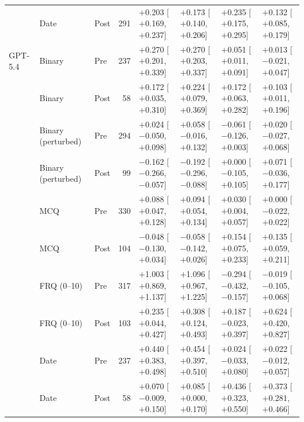 \begin{table}[p]
\begin{tabular}{l l l r l l l l}
 & Date & Post & 291 & $+$0.203 {\scriptsize[$+$0.169, $+$0.237]} & $+$0.173 {\scriptsize[$+$0.140, $+$0.206]} & $+$0.235 {\scriptsize[$+$0.175, $+$0.295]} & $+$0.132 {\scriptsize[$+$0.085, $+$0.179]} \\
\addlinespace
GPT-5.4 & Binary & Pre & 237 & $+$0.270 {\scriptsize[$+$0.201, $+$0.339]} & $+$0.270 {\scriptsize[$+$0.203, $+$0.337]} & $+$0.051 {\scriptsize[$+$0.011, $+$0.091]} & $+$0.013 {\scriptsize[$-$0.021, $+$0.047]} \\
 & Binary & Post & 58 & $+$0.172 {\scriptsize[$+$0.035, $+$0.310]} & $+$0.224 {\scriptsize[$+$0.079, $+$0.369]} & $+$0.172 {\scriptsize[$+$0.063, $+$0.282]} & $+$0.103 {\scriptsize[$+$0.011, $+$0.196]} \\
 & Binary (perturbed) & Pre & 294 & $+$0.024 {\scriptsize[$-$0.050, $+$0.098]} & $+$0.058 {\scriptsize[$-$0.016, $+$0.132]} & $-$0.061 {\scriptsize[$-$0.126, $+$0.003]} & $+$0.020 {\scriptsize[$-$0.027, $+$0.068]} \\
 & Binary (perturbed) & Post & 99 & $-$0.162 {\scriptsize[$-$0.266, $-$0.057]} & $-$0.192 {\scriptsize[$-$0.296, $-$0.088]} & $+$0.000 {\scriptsize[$-$0.105, $+$0.105]} & $+$0.071 {\scriptsize[$-$0.036, $+$0.177]} \\
 & MCQ & Pre & 330 & $+$0.088 {\scriptsize[$+$0.047, $+$0.128]} & $+$0.094 {\scriptsize[$+$0.054, $+$0.134]} & $+$0.030 {\scriptsize[$+$0.004, $+$0.057]} & $+$0.000 {\scriptsize[$-$0.022, $+$0.022]} \\
 & MCQ & Post & 104 & $-$0.048 {\scriptsize[$-$0.130, $+$0.034]} & $-$0.058 {\scriptsize[$-$0.142, $+$0.026]} & $+$0.154 {\scriptsize[$+$0.075, $+$0.233]} & $+$0.135 {\scriptsize[$+$0.059, $+$0.211]} \\
 & FRQ (0--10) & Pre & 317 & $+$1.003 {\scriptsize[$+$0.869, $+$1.137]} & $+$1.096 {\scriptsize[$+$0.967, $+$1.225]} & $-$0.294 {\scriptsize[$-$0.432, $-$0.157]} & $-$0.019 {\scriptsize[$-$0.105, $+$0.068]} \\
 & FRQ (0--10) & Post & 103 & $+$0.235 {\scriptsize[$+$0.044, $+$0.427]} & $+$0.308 {\scriptsize[$+$0.124, $+$0.493]} & $+$0.187 {\scriptsize[$-$0.023, $+$0.397]} & $+$0.624 {\scriptsize[$+$0.420, $+$0.827]} \\
 & Date & Pre & 237 & $+$0.440 {\scriptsize[$+$0.383, $+$0.498]} & $+$0.454 {\scriptsize[$+$0.397, $+$0.510]} & $+$0.024 {\scriptsize[$-$0.033, $+$0.080]} & $+$0.022 {\scriptsize[$-$0.012, $+$0.057]} \\
 & Date & Post & 58 & $+$0.070 {\scriptsize[$-$0.009, $+$0.150]} & $+$0.085 {\scriptsize[$+$0.000, $+$0.170]} & $+$0.436 {\scriptsize[$+$0.323, $+$0.550]} & $+$0.373 {\scriptsize[$+$0.281, $+$0.466]} \\

\end{tabular}
\end{table}
